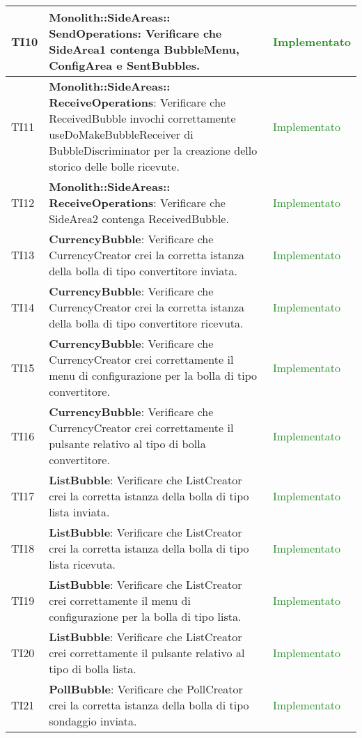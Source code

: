 \begin{center}
\begin{longtable}{|
*{1}{>{\centering\arraybackslash}p{1cm}|}
*{1}{>{\centering\arraybackslash}p{7cm}|}
*{1}{>{\centering\arraybackslash}p{3cm}|}}
 \hline 
TI10 & \textbf{Monolith::SideAreas:: SendOperations}: Verificare che SideArea1 contenga BubbleMenu, ConfigArea e SentBubbles. & \textcolor{ForestGreen}{Implementato}\\
 \hline 
TI11 & \textbf{Monolith::SideAreas:: ReceiveOperations}: Verificare che ReceivedBubble invochi correttamente useDoMakeBubbleReceiver di BubbleDiscriminator per la creazione dello storico delle bolle ricevute. & \textcolor{ForestGreen}{Implementato}\\
 \hline 
TI12 & \textbf{Monolith::SideAreas:: ReceiveOperations}: Verificare che SideArea2 contenga ReceivedBubble. & \textcolor{ForestGreen}{Implementato}\\
 \hline 
TI13 & \textbf{CurrencyBubble}: Verificare che CurrencyCreator crei la corretta istanza della bolla di tipo convertitore inviata. & \textcolor{ForestGreen}{Implementato}\\
 \hline 
TI14 & \textbf{CurrencyBubble}: Verificare che CurrencyCreator crei la corretta istanza della bolla di tipo convertitore ricevuta. & \textcolor{ForestGreen}{Implementato}\\
 \hline 
TI15 & \textbf{CurrencyBubble}: Verificare che CurrencyCreator crei correttamente il menu di configurazione per la bolla di tipo convertitore. & \textcolor{ForestGreen}{Implementato}\\
 \hline 
TI16 & \textbf{CurrencyBubble}: Verificare che CurrencyCreator crei correttamente il pulsante relativo al tipo di bolla convertitore. & \textcolor{ForestGreen}{Implementato}\\
 \hline 
TI17 & \textbf{ListBubble}: Verificare che ListCreator crei la corretta istanza della bolla di tipo lista inviata. & \textcolor{ForestGreen}{Implementato}\\
 \hline 
TI18 & \textbf{ListBubble}: Verificare che ListCreator crei la corretta istanza della bolla di tipo lista ricevuta. & \textcolor{ForestGreen}{Implementato}\\
 \hline 
TI19 & \textbf{ListBubble}: Verificare che ListCreator crei correttamente il menu di configurazione per la bolla di tipo lista. & \textcolor{ForestGreen}{Implementato}\\
 \hline 
TI20 & \textbf{ListBubble}: Verificare che ListCreator crei correttamente il pulsante relativo al tipo di bolla lista. & \textcolor{ForestGreen}{Implementato}\\
 \hline 
TI21 & \textbf{PollBubble}: Verificare che PollCreator crei la corretta istanza della bolla di tipo sondaggio inviata. & \textcolor{ForestGreen}{Implementato}\\

\end{longtable}
\end{center}
